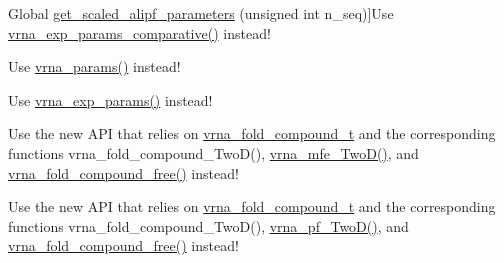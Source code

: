 \begin{DoxyRefList}
\hypertarget{deprecated__deprecated000088}{}%
Global \hyperlink{group__energy__parameters_ga0ccf4e1be085a573533fd6b9da2d8cf9}{get\+\_\+scaled\+\_\+alipf\+\_\+parameters} (unsigned int n\+\_\+seq)]Use \hyperlink{group__energy__parameters_gaf78c09e685e6eef4100b1a41d4042550}{vrna\+\_\+exp\+\_\+params\+\_\+comparative()} instead! 
\item[\label{deprecated__deprecated000091}%
\hypertarget{deprecated__deprecated000091}{}%
Global \hyperlink{group__energy__parameters_ga7fa6a000d7c16feab939f2c4ee626197}{get\+\_\+scaled\+\_\+parameters} (double temperature, vrna\+\_\+md\+\_\+t md)]Use \hyperlink{group__energy__parameters_gad0e3e7e74bdc50d1709d40c92993185e}{vrna\+\_\+params()} instead! 
\item[\label{deprecated__deprecated000085}%
\hypertarget{deprecated__deprecated000085}{}%
Global \hyperlink{group__energy__parameters_gabf3b9271c41dd3fac02d56e0b02b3344}{get\+\_\+scaled\+\_\+pf\+\_\+parameters} (void)]Use \hyperlink{group__energy__parameters_gab1f3016f96aa96bff020cdd904605afa}{vrna\+\_\+exp\+\_\+params()} instead! 
\item[\label{deprecated__deprecated000002}%
\hypertarget{deprecated__deprecated000002}{}%
Global \hyperlink{group__kl__neighborhood__mfe_gac9284f132cf0eaa0a2f43590eda05488}{get\+\_\+\+Two\+Dfold\+\_\+variables} (const char $\ast$seq, const char $\ast$structure1, const char $\ast$structure2, int circ)]Use the new A\+P\+I that relies on \hyperlink{group__fold__compound_ga1b0cef17fd40466cef5968eaeeff6166}{vrna\+\_\+fold\+\_\+compound\+\_\+t} and the corresponding functions vrna\+\_\+fold\+\_\+compound\+\_\+\+Two\+D(), \hyperlink{group__kl__neighborhood__mfe_ga243c288b463147352829df04de6a2f77}{vrna\+\_\+mfe\+\_\+\+Two\+D()}, and \hyperlink{group__fold__compound_gadded6039d63f5d6509836e20321534ad}{vrna\+\_\+fold\+\_\+compound\+\_\+free()} instead! 
\item[\label{deprecated__deprecated000007}%
\hypertarget{deprecated__deprecated000007}{}%
Global \hyperlink{2Dpfold_8h_a1aca740e2a75ab2b2951538266e53d64}{get\+\_\+\+Two\+Dpfold\+\_\+variables} (const char $\ast$seq, const char $\ast$structure1, char $\ast$structure2, int circ)]Use the new A\+P\+I that relies on \hyperlink{group__fold__compound_ga1b0cef17fd40466cef5968eaeeff6166}{vrna\+\_\+fold\+\_\+compound\+\_\+t} and the corresponding functions vrna\+\_\+fold\+\_\+compound\+\_\+\+Two\+D(), \hyperlink{group__kl__neighborhood__pf_ga0bc3427689bd09da09b8b3094a27f836}{vrna\+\_\+pf\+\_\+\+Two\+D()}, and \hyperlink{group__fold__compound_gadded6039d63f5d6509836e20321534ad}{vrna\+\_\+fold\+\_\+compound\+\_\+free()} instead! 

\end{DoxyRefList}
